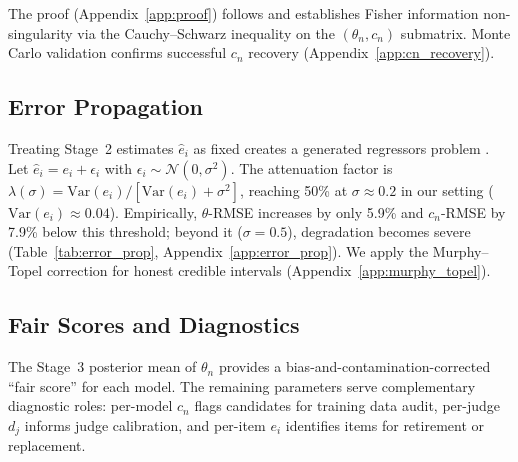 The proof (Appendix~\ref{app:proof}) follows \citet{rothenberg1971} and establishes Fisher information non-singularity via the Cauchy--Schwarz inequality on the $(\theta_n, c_n)$ submatrix. Monte Carlo validation confirms successful $c_n$ recovery (Appendix~\ref{app:cn_recovery}).

\subsection{Error Propagation}
\label{sec:error_prop}

Treating Stage~2 estimates $\hat{e}_i$ as fixed creates a generated regressors problem \citep{pagan1984}. Let $\hat{e}_i = e_i + \epsilon_i$ with $\epsilon_i \sim \mathcal{N}(0, \sigma^2)$. The attenuation factor is $\lambda(\sigma) = \mathrm{Var}(e_i) / [\mathrm{Var}(e_i) + \sigma^2]$, reaching 50\% at $\sigma \approx 0.2$ in our setting ($\mathrm{Var}(e_i) \approx 0.04$). Empirically, $\theta$-RMSE increases by only 5.9\% and $c_n$-RMSE by 7.9\% below this threshold; beyond it ($\sigma = 0.5$), degradation becomes severe (Table~\ref{tab:error_prop}, Appendix~\ref{app:error_prop}). We apply the Murphy--Topel correction \citep{murphy1985} for honest credible intervals (Appendix~\ref{app:murphy_topel}).

\subsection{Fair Scores and Diagnostics}
\label{sec:fair_scores}

The Stage~3 posterior mean of $\theta_n$ provides a bias-and-contamination-corrected ``fair score'' for each model. The remaining parameters serve complementary diagnostic roles: per-model $c_n$ flags candidates for training data audit, per-judge $d_j$ informs judge calibration, and per-item $e_i$ identifies items for retirement or replacement.
